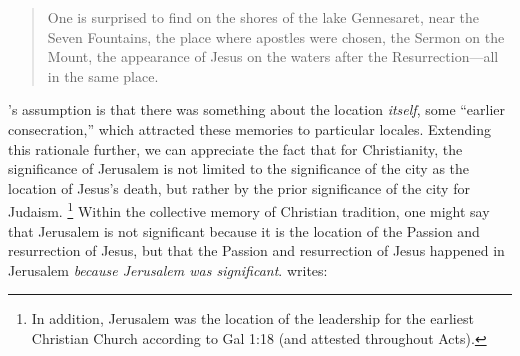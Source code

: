 \begin{quote}
    One is surprised to find on the shores of the lake Gennesaret, near the Seven Fountains, the place where apostles were chosen, the Sermon on the Mount, the appearance of Jesus on the waters after the Resurrection---all in the same place.%
        \autocite[220]{halbwachs1992}
\end{quote}  
\noindent
\halbwachs's assumption is that there was something about the location \emph{itself}, some ``earlier consecration,''%
    \autocite[220]{halbwachs1992}
which attracted these memories to particular locales. Extending this rationale further, we can appreciate the fact that for Christianity, the significance of Jerusalem is not limited to the significance of the city as the location of Jesus's death, but rather by the prior significance of the city for Judaism.%
    \footnote{%
        In addition, Jerusalem was the location of the leadership for the earliest Christian Church according to Gal 1:18 (and attested throughout Acts).}
%
Within the collective memory of Christian tradition, one might say that Jerusalem is not significant because it is the location of the Passion and resurrection of Jesus, but that the Passion and resurrection of Jesus happened in Jerusalem \emph{because Jerusalem was significant}. \halbwachs writes:  

